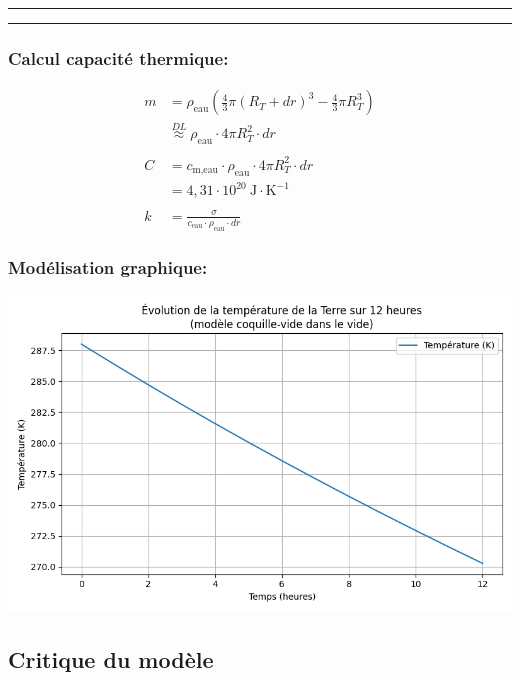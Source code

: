 \documentclass[a4paper,12pt]{article}
\begin{document}
\noindent\textcolor{gray}{\rule{\linewidth}{0.4pt}}

    
\begin{center}
  
\end{center}



\noindent\textcolor{gray}{\rule{\linewidth}{0.4pt}} 


\subsubsection*{Calcul capacité thermique:} 


\begin{align*}
m &= \rho_{\text{eau}} \left( \frac{4}{3} \pi (R_T + dr)^3 - \frac{4}{3} \pi R_T^3 \right) \\
&\overset{DL}{\approx} \rho_{\text{eau}} \cdot 4\pi R_T^2 \cdot dr \\
\\
C &= c_{\text{m,eau}} \cdot \rho_{\text{eau}} \cdot 4\pi R_T^2 \cdot dr \\
&= 4{,}31 \cdot 10^{20} \ \text{J} \cdot \text{K}^{-1} \\
\\
k &= \frac{\sigma }{c_{\text{eau}} \cdot \rho_{\text{eau}} \cdot dr}
\end{align*}

\subsubsection*{Modélisation graphique:}   
\begin{center}
  \includegraphics[width=0.8\linewidth]{../modele1/figures/modele1_coquille.png} 
\end{center}



\subsection*{Critique du modèle}
\end{document}

